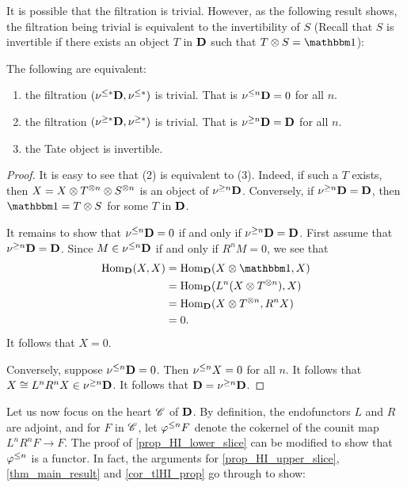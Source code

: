 It is possible that the filtration is trivial. However, as the
following result shows, the filtration being trivial is equivalent
to the invertibility of $S$ (Recall that $S$ is invertible if 
there exists an object $T$ in $\mathbf{D}$ such that $T \tensor S = 
\Unit$):

\begin{prop}\label{prop_filt_trivial_cond}
The following are equivalent:
\begin{enumerate}
\item the filtration $(\nu^{\leq *}\mathbf{D}, \nu^{\leq *})$ is trivial. 
That is $\nu^{\leq n}\mathbf{D} = 0$ for all $n$.

\item the filtration $(\nu^{\geq *}\mathbf{D}, \nu^{\geq *})$ is trivial.
That is $\nu^{\geq n}\mathbf{D} = \mathbf{D}$ for all $n$.

\item the Tate object is invertible.
\end{enumerate}
\end{prop}
\begin{proof}
It is easy to see that (2) is equivalent to (3). Indeed, if such
a $T$ exists, then $X = X \otimes T^{\otimes n} \otimes 
S^{\otimes n}$ is an object of $\nu^{\geq n}\mathbf{D}$. Conversely, if
$\nu^{\geq n}\mathbf{D} = \mathbf{D}$, then $\Unit = T \tensor S$ for some
$T$ in $\mathbf{D}$.

It remains to show that $\nu^{\leq n}\mathbf{D} = 0$ if and only if
$\nu^{\geq n}\mathbf{D} = \mathbf{D}$. First assume that $\nu^{\geq n}\mathbf{D} = 
\mathbf{D}$. Since $M \in \nu^{\leq n}\mathbf{D}$ if and only if $R^n M = 0$,
we see that
\begin{align*}
\hom_{\DCat}(X, X) &= \hom_{\DCat}(X \tensor \Unit, X) \\
&= \hom_{\DCat}(L^n(X \tensor T^{\tensor n}), X) \\
&= \hom_{\DCat}(X \tensor T^{\tensor n}, R^n X) \\
&= 0.
\end{align*}
It follows that $X = 0$.

Conversely, suppose $\nu^{\leq n}\mathbf{D} = 0$. Then $\nu^{\leq n}X = 0$
for all $n$. It follows that $X \cong L^n R^n X \in 
\nu^{\geq n}\mathbf{D}$. It follows that $\mathbf{D} = \nu^{\geq n}\mathbf{D}$.
\end{proof}

Let us now focus on the heart $\mathscr{C}$ of $\mathbf{D}$. By definition,
the endofunctors $L$ and $R$ are adjoint, and for $F$ in 
$\mathscr{C}$, let $\varphi^{\leq n} F$ denote the cokernel of the counit map 
$L^n R^n F \to F$. The proof of \ref{prop_HI_lower_slice} can be
modified to show that $\varphi^{\leq n}$ is a functor. In fact, the 
arguments for \ref{prop_HI_upper_slice}, \ref{thm_main_result} and 
\ref{cor_tlHI_prop} go through to show:

